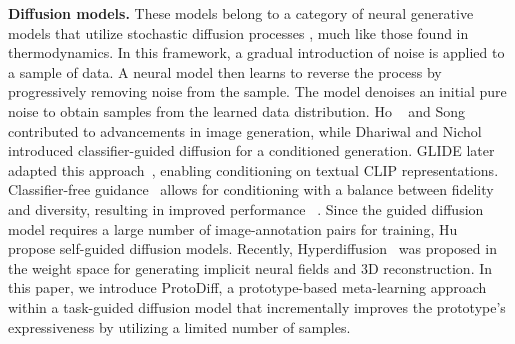 \textbf{Diffusion models.} These models belong to a category of neural generative models that utilize stochastic diffusion processes \cite{sohl2015deep,song2020denoising}, much like those found in thermodynamics. In this framework, a gradual introduction of noise 
is applied to a sample of data. 
A neural model then learns to reverse the process by progressively removing noise from the sample. The model denoises an initial pure noise to obtain samples from the learned data distribution. Ho \etal~\cite{ho2020denoising} and Song \etal~\cite{song2020denoising} contributed to advancements in image generation, while Dhariwal and Nichol \cite{dhariwal2021diffusion} introduced classifier-guided diffusion for a conditioned generation. GLIDE later adapted this approach~\cite{nichol2021glide}, enabling conditioning on textual CLIP representations. Classifier-free guidance~\cite{ho2022classifier} allows for conditioning with a balance between fidelity and diversity, resulting in improved performance ~\cite{nichol2021glide}. Since the guided diffusion model requires a large number of image-annotation pairs for training, Hu \etal~\cite{hu2022self} propose self-guided diffusion models. 
Recently, Hyperdiffusion~\cite{erkocc2023hyperdiffusion, lutati2022ocd} was proposed in the weight space for generating implicit neural fields and 3D reconstruction.
In this paper, we introduce ProtoDiff, a prototype-based meta-learning approach within a task-guided diffusion model that incrementally improves the prototype's expressiveness by utilizing a limited number of samples.


